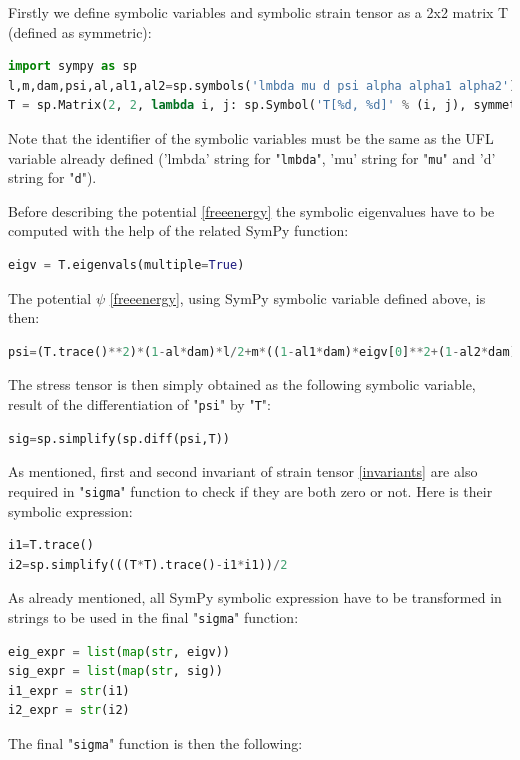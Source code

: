 \documentclass[12pt]{article}
\newcommand{\mycodepy}[1]{\textsf{"}\lstinline[language=Python]`#1`\textsf{"}}
\begin{document}
Firstly we define symbolic variables and symbolic strain tensor as a 2x2 matrix T (defined as symmetric):
\begin{lstlisting}[numbers=none,basicstyle=\footnotesize,language=python]
import sympy as sp
l,m,dam,psi,al,al1,al2=sp.symbols('lmbda mu d psi alpha alpha1 alpha2')
T = sp.Matrix(2, 2, lambda i, j: sp.Symbol('T[%d, %d]' % (i, j), symmetric=True, real=True))
\end{lstlisting}
Note that the identifier of the symbolic variables must be the same as the UFL variable already defined ('lmbda' string for \mycodepy{lmbda}, 'mu' string for \mycodepy{mu} and 'd' string for \mycodepy{d}).
 
Before describing the potential \eqref{freeenergy} the symbolic eigenvalues have to be computed with the help of the related SymPy function:
\begin{lstlisting}[numbers=none,basicstyle=\footnotesize,language=python]
eigv = T.eigenvals(multiple=True) 
\end{lstlisting}
The potential $\psi$  \eqref{freeenergy}, using SymPy symbolic variable defined above, is then:
\begin{lstlisting}[numbers=none,basicstyle=\footnotesize,language=python]
psi=(T.trace()**2)*(1-al*dam)*l/2+m*((1-al1*dam)*eigv[0]**2+(1-al2*dam)*eigv[1]**2)
 \end{lstlisting}
The stress tensor is then simply obtained as the following symbolic variable, result of the differentiation of \mycodepy{psi} by \mycodepy{T}:
\begin{lstlisting}[numbers=none,basicstyle=\footnotesize,language=python]
sig=sp.simplify(sp.diff(psi,T)) 
\end{lstlisting}
As  mentioned, first and second invariant of strain tensor \eqref{invariants} are also required in \mycodepy{sigma} function to check if they are both zero or not. Here is their symbolic expression:
\begin{lstlisting}[numbers=none,basicstyle=\footnotesize,language=python]
i1=T.trace()
i2=sp.simplify(((T*T).trace()-i1*i1))/2
\end{lstlisting}
As already mentioned, all SymPy symbolic expression have to be transformed in strings to be used in the final \mycodepy{sigma} function:
\begin{lstlisting}[numbers=none,basicstyle=\footnotesize,language=python]
eig_expr = list(map(str, eigv))
sig_expr = list(map(str, sig))
i1_expr = str(i1)
i2_expr = str(i2)
\end{lstlisting} 
The final \mycodepy{sigma} function is then the following:
\end{document}
